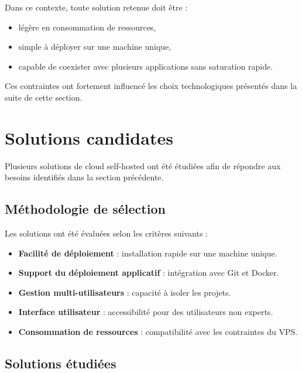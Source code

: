 \documentclass{rapportClass} %
\begin{document}
\smallskip
Dans ce contexte, toute solution retenue doit être :
\begin{itemize}
\item légère en consommation de ressources,
\item simple à déployer sur une machine unique,
\item capable de coexister avec plusieurs applications sans saturation rapide.
\end{itemize}

Ces contraintes ont fortement influencé les choix technologiques
présentés dans la suite de cette section.

\section{Solutions candidates}

Plusieurs solutions de cloud self-hosted ont été étudiées afin de
répondre aux besoins identifiés dans la section précédente.



\subsection{Méthodologie de sélection}

Les solutions ont été évaluées selon les critères suivants :

\begin{itemize}
\item \textbf{Facilité de déploiement} : installation rapide sur une machine unique.
\item \textbf{Support du déploiement applicatif} : intégration avec Git et Docker.
\item \textbf{Gestion multi-utilisateurs} : capacité à isoler les projets.
\item \textbf{Interface utilisateur} : accessibilité pour des utilisateurs non experts.
\item \textbf{Consommation de ressources} : compatibilité avec les contraintes du VPS.
\end{itemize}
\subsection{Solutions étudiées}
\end{document}
